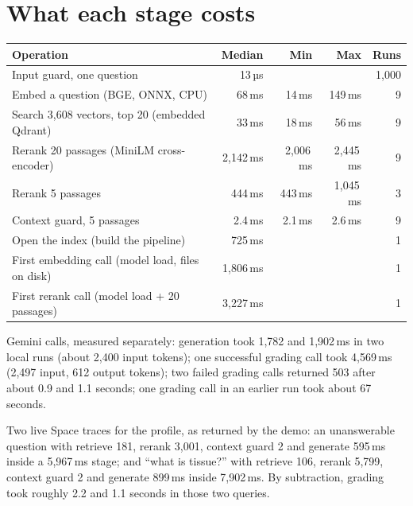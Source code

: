 \section{What each stage costs}

\begin{measured}
\begin{center}
\begin{tabular}{@{}lrrrr@{}}
\toprule
\textbf{Operation} & \textbf{Median} & \textbf{Min} & \textbf{Max} & \textbf{Runs}\\
\midrule
Input guard, one question & 13\,µs & & & 1,000\\
Embed a question (BGE, ONNX, CPU) & 68\,ms & 14\,ms & 149\,ms & 9\\
Search 3,608 vectors, top 20 (embedded Qdrant) & 33\,ms & 18\,ms & 56\,ms & 9\\
Rerank 20 passages (MiniLM cross-encoder) & 2,142\,ms & 2,006\,ms & 2,445\,ms & 9\\
Rerank 5 passages & 444\,ms & 443\,ms & 1,045\,ms & 3\\
Context guard, 5 passages & 2.4\,ms & 2.1\,ms & 2.6\,ms & 9\\
\midrule
Open the index (build the pipeline) & 725\,ms & & & 1\\
First embedding call (model load, files on disk) & 1,806\,ms & & & 1\\
First rerank call (model load + 20 passages) & 3,227\,ms & & & 1\\
\bottomrule
\end{tabular}
\end{center}
Gemini calls, measured separately: generation took 1,782 and 1,902\,ms in two local runs (about 2,400 input tokens); one successful grading call took 4,569\,ms (2,497 input, 612 output tokens); two failed grading calls returned 503 after about 0.9 and 1.1 seconds; one grading call in an earlier run took about 67 seconds.
\end{measured}

Two live Space traces for the  profile, as returned by the demo: an unanswerable question with retrieve 181, rerank 3,001, context guard 2 and generate 595\,ms inside a 5,967\,ms  stage; and \enquote{what is tissue?} with retrieve 106, rerank 5,799, context guard 2 and generate 899\,ms inside 7,902\,ms. By subtraction, grading took roughly 2.2 and 1.1 seconds in those two queries.

